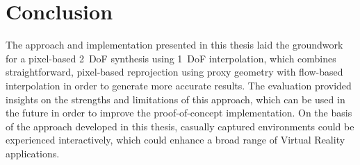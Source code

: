 \chapter{Conclusion}

The approach and implementation presented in this thesis laid the groundwork for a pixel-based 2~DoF synthesis using 1~DoF interpolation, which combines
straightforward, pixel-based reprojection using proxy geometry with flow-based interpolation in order to generate more accurate results.
The evaluation provided insights on the strengths and limitations of this approach, which can be used in the future in order to improve the proof-of-concept implementation.
On the basis of the approach developed in this thesis,
casually captured environments could be experienced interactively, which could enhance a broad range of Virtual Reality applications.



